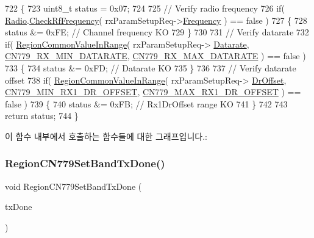\begin{DoxyCode}
722 \{
723     uint8\_t status = 0x07;
724 
725     \textcolor{comment}{// Verify radio frequency}
726     \textcolor{keywordflow}{if}( \mbox{\hyperlink{sx1276mb1las_8c_acf9fe61a72c16fa29a0dc449d23e3820}{Radio}}.\mbox{\hyperlink{struct_radio__s_a984f224d5ef26fb8a35f77d664f384df}{CheckRfFrequency}}( rxParamSetupReq->\mbox{\hyperlink{structs_rx_param_setup_req_params_ade3d190636488dad9a89b19446b7acf1}{Frequency}} ) == false )
727     \{
728         status &= 0xFE; \textcolor{comment}{// Channel frequency KO}
729     \}
730 
731     \textcolor{comment}{// Verify datarate}
732     \textcolor{keywordflow}{if}( \mbox{\hyperlink{group___r_e_g_i_o_n_c_o_m_m_o_n_gafdd1c80d953e18d755a631b72a9c3bd3}{RegionCommonValueInRange}}( rxParamSetupReq->
      \mbox{\hyperlink{structs_rx_param_setup_req_params_ae2f6080f3aa0e9485c55513ca56bb24d}{Datarate}}, \mbox{\hyperlink{group___r_e_g_i_o_n_c_n779_ga9b8a3086475f37d72484e75a4bf8f4a5}{CN779\_RX\_MIN\_DATARATE}}, 
      \mbox{\hyperlink{group___r_e_g_i_o_n_c_n779_ga89261ba0eddf04555c7a38fff0dff2d6}{CN779\_RX\_MAX\_DATARATE}} ) == false )
733     \{
734         status &= 0xFD; \textcolor{comment}{// Datarate KO}
735     \}
736 
737     \textcolor{comment}{// Verify datarate offset}
738     \textcolor{keywordflow}{if}( \mbox{\hyperlink{group___r_e_g_i_o_n_c_o_m_m_o_n_gafdd1c80d953e18d755a631b72a9c3bd3}{RegionCommonValueInRange}}( rxParamSetupReq->
      \mbox{\hyperlink{structs_rx_param_setup_req_params_ad920e18a48423b1eb1fe40d1b2b082d4}{DrOffset}}, \mbox{\hyperlink{group___r_e_g_i_o_n_c_n779_gae0ef3405f8d33d4b21e74588b50c2569}{CN779\_MIN\_RX1\_DR\_OFFSET}}, 
      \mbox{\hyperlink{group___r_e_g_i_o_n_c_n779_ga92a7cb914b3c213f1506f8dd927e6077}{CN779\_MAX\_RX1\_DR\_OFFSET}} ) == false )
739     \{
740         status &= 0xFB; \textcolor{comment}{// Rx1DrOffset range KO}
741     \}
742 
743     \textcolor{keywordflow}{return} status;
744 \}
\end{DoxyCode}
이 함수 내부에서 호출하는 함수들에 대한 그래프입니다.\+:
\mbox{\label{group___r_e_g_i_o_n_c_n779_gab7e1485f1112861ad7dae9801995a2c4}} 
\subsubsection{\texorpdfstring{Region\+C\+N779\+Set\+Band\+Tx\+Done()}{RegionCN779SetBandTxDone()}}
{\footnotesize\ttfamily void Region\+C\+N779\+Set\+Band\+Tx\+Done (\begin{DoxyParamCaption}\item[{\mbox{\hyperlink{group___r_e_g_i_o_n_gad0524aa0673c0814a71e7a4f9cade3fc}{Set\+Band\+Tx\+Done\+Params\+\_\+t}} $\ast$}]{tx\+Done }\end{DoxyParamCaption})}



